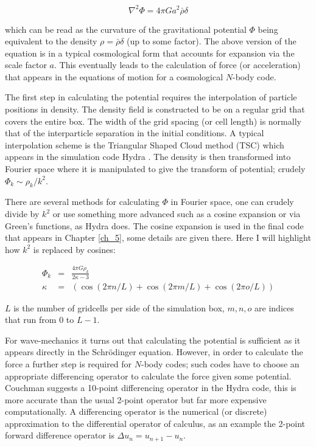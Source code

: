 \begin{equation}
\nabla^2 \Phi = 4\pi G a^2 \bar\rho \delta
\end{equation}

\noindent which can be read as the curvature of the gravitational potential $\Phi$ being equivalent to the density $\rho = \bar\rho\delta$ (up to some factor). The above version of the equation is in a typical cosmological form that accounts for expansion via the scale factor $a$. This eventually leads to the calculation of force (or acceleration) that appears in the equations of motion for a cosmological $N$-body code.

The first step in calculating the potential requires the interpolation of particle positions in density. The density field is constructed to be on a regular grid that covers the entire box. The width of the grid spacing (or cell length) is normally that of the interparticle separation in the initial conditions. A typical interpolation scheme is the Triangular Shaped Cloud method (TSC) which appears in the simulation code Hydra \citep{bib_hmpc1, bib_hmpc}. The density is then transformed into Fourier space where it is manipulated to give the transform of potential; crudely $ \Phi_k \sim \rho_k / k^2$.

There are several methods for calculating $\Phi$ in Fourier space, one can crudely divide by $k^2$ or use something more advanced such as a cosine expansion \citep{bib_nr} or via Green's functions, as Hydra does. The cosine expansion is used in the final code that appears in Chapter \ref{ch_5}, some details are given there. Here I will highlight how $k^2$ is replaced by cosines:

\begin{eqnarray}
 \Phi_k &=&  \frac{4\pi G \rho_k}{ 2 \kappa - 3} \nonumber\\
 \kappa &=& (\cos(2 \pi n/L) + \cos(2 \pi m/L) + \cos(2 \pi o/L))
\end{eqnarray}

\noindent $L$ is the number of gridcells per side of the simulation box, $m,n,o$ are indices that run from 0 to $L -1$.

For wave-mechanics it turns out that calculating the potential is sufficient as it appears directly in the Schr\"odinger equation. However, in order to calculate the force a further step is required for $N$-body codes; such codes have to choose an appropriate differencing operator to calculate the force given some potential. Couchman suggests a 10-point differencing operator in the Hydra code, this is more accurate than the usual 2-point operator but far more expensive computationally. A differencing operator is the numerical (or discrete) approximation to the differential operator of calculus, as an example the 2-point forward difference operator is $\Delta u_n = u_{n+1} - u_n$.

